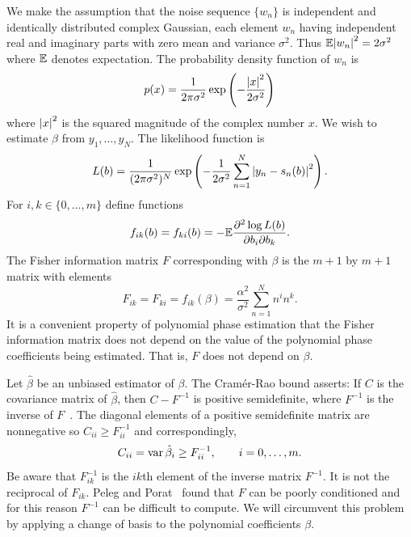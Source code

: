 \documentclass[review]{elsarticle}
\begin{document}
We make the assumption that the noise sequence $\{ w_n \}$ is independent and identically distributed complex Gaussian, each element $w_n$ having independent real and imaginary parts with zero mean and variance $\sigma^2$. Thus ${\mathbb E}{\left| w_n \right|}^2 = 2\sigma^2$ where ${\mathbb E}$ denotes expectation.  The probability density function of $w_n$ is 
\[
p(x) = \frac{1}{2 \pi \sigma^2} \exp\left( -\frac{{\left| x \right|}^2}{2\sigma^2} \right)
\]
where ${\left| x \right|}^2$ is the squared magnitude of the complex number $x$.  We wish to estimate $\beta$ from $y_1, \dots, y_N$.  The likelihood function is
\[
L(b) = \frac{1}{(2 \pi \sigma^2)^N} \exp\left( - \frac{1}{2\sigma^{2}} \sum_{n=1}^N {\left| y_n -  s_n(b)  \right|}^2 \right).
\]
For $i,k \in \{0, \dots, m\}$ define functions 
\[
f_{ik}(b) = f_{ki}(b) = -{\mathbb E} \frac{ \partial^2 \log L(b) }{ \partial b_{i} \partial b_{k}}.
\]  
The Fisher information matrix $F$ corresponding with $\beta$ is the $m+1$ by $m+1$ matrix with elements
\[
F_{ik} = F_{ki} = f_{ik}(\beta) = \frac{\alpha^2}{\sigma^2}\sum_{n=1}^{N} n^{i}n^{k}.
\]
It is a convenient property of polynomial phase estimation that the Fisher information matrix does not depend on the value of the polynomial phase coefficients being estimated.  That is, $F$ does not depend on $\beta$.

Let $\hat{\beta}$ be an unbiased estimator of $\beta$.  The Cram\'{e}r-Rao bound asserts:  If $C$ is the covariance matrix of $\hat{\beta}$, then $C - F^{-1}$ is positive semidefinite, where $F^{-1}$ is the inverse of $F$~\cite{Kay1993_stat_sig_est_theory}.  The diagonal elements of a positive semidefinite matrix are nonnegative so $C_{ii} \geq F^{-1}_{ii}$ and correspondingly, 
\[
C_{ii} = \operatorname{var} \hat{\beta}_{i} \geq F_{ii}^{-1}, \qquad i=0,\dots,m.
\]  
Be aware that $F_{ik}^{-1}$ is the $ik$th element of the inverse matrix $F^{-1}$.  It is not the reciprocal of $F_{ik}$.  Peleg and Porat~\cite{Peleg1991_CRB_PPS_1991} found that $F$ can be poorly conditioned and for this reason $F^{-1}$ can be difficult to compute.   We will circumvent this problem by applying a change of basis to the polynomial coefficients $\beta$.  %
\end{document}
